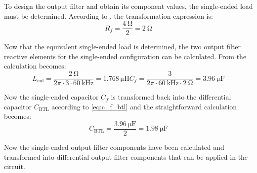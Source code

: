 To design the output filter and obtain its component values, the single-ended load must be determined. According to , the transformation expression is:
\begin{equation} \label{eq:output_filter_rf_synth}
	R_{f} = \frac{\SI{4}{\ohm}}{2} = \SI{2}{\ohm}
\end{equation}

Now that the equivalent single-ended load is determined, the two output filter reactive elements for the single-ended configuration can be calculated. From  the calculation becomes:
\begin{subequations} \label{eq:output_filter_synth}
	\begin{equation} \label{eq:output_filter_l_ind_synth}
		L_{\mathrm{ind}} = \frac{\SI{2}{\ohm}}{2\pi \cdot 3 \cdot \SI{60}{\kilo\hertz}} = \SI{1.768}{\micro\henry}
	\end{equation}
	\begin{equation} \label{eq:output_filter_c_f_synth}
		C_{f} = \frac{3}{2\pi \cdot \SI{60}{\kilo\hertz} \cdot \SI{2}{\ohm}} = \SI{3.96}{\micro\farad}
	\end{equation}
\end{subequations}

Now the single-ended capacitor $C_{f}$ is transformed back into the differential capacitor $C_{\mathrm{BTL}}$ according to \autoref{eq:c_f_btl} and the straightforward calculation becomes:
\begin{equation} \label{eq:c_f_btl_synth}
	C_{\mathrm{BTL}} = \frac{\SI{3.96}{\micro\farad}}{2} = \SI{1.98}{\micro\farad}
\end{equation}

%

Now the single-ended output filter components have been calculated and transformed into differential output filter components that can be applied in the circuit.

